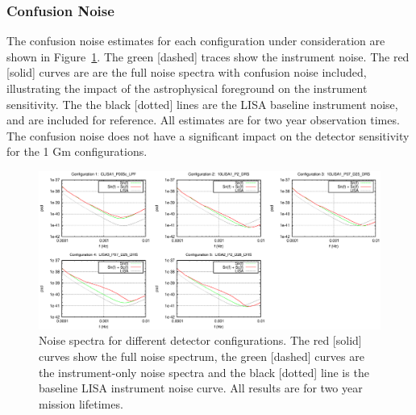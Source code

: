 \documentclass{iopart}
\begin{document}
\subsubsection{Confusion Noise}
The confusion noise estimates for each configuration under consideration are shown in Figure~\ref{Figure:Confusion}.  The green [dashed] traces show the instrument noise.  The red [solid] curves are are the full noise spectra with confusion noise included, illustrating the impact of the astrophysical foreground on the instrument sensitivity.  The the black [dotted] lines are 
the LISA baseline instrument noise, and are included for reference.  All estimates are for two year observation 
times.  The confusion noise does not have a significant impact on the detector sensitivity for the 1 Gm configurations.
\begin{figure}[H]
\begin{center}
   \includegraphics[width=1\textwidth]{FigGBTyson/confusion.eps} %
   \caption{Noise spectra for different detector configurations.  The red [solid] curves show the full noise spectrum, the green [dashed] curves are the instrument-only noise spectra and the black [dotted] line is the baseline LISA instrument noise curve.  All results are for two year mission lifetimes. }
   \label{Figure:Confusion}
  \end{center}
\end{figure}
\end{document}
